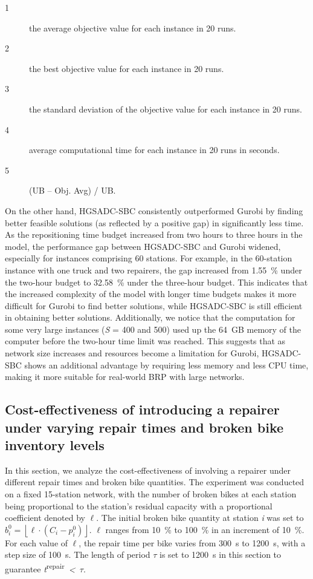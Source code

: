 \begin{landscape}
\begin{description}
\item[1]
the average objective value for each instance in 20 runs.
\item[2]
the best objective value for each instance in 20 runs.
\item[3]
the standard deviation of the objective value for each instance in 20 runs.
\item[4]
average computational time for each instance in 20 runs in seconds.
\item[5]
(UB -- Obj. Avg) / UB.
\end{description}
\end{landscape}

On the other hand, HGSADC-SBC consistently outperformed Gurobi by finding better feasible solutions
(as reflected by a positive gap) in significantly less time. As the repositioning time budget
increased from two hours to three hours in the model, the performance gap between HGSADC-SBC and
Gurobi widened, especially for instances comprising 60 stations. For example, in the 60-station
instance with one truck and two repairers, the gap increased from 1.55~\% under the two-hour budget
to 32.58~\% under the three-hour budget. This indicates that the increased complexity of the model
with longer time budgets makes it more difficult for Gurobi to find better solutions, while
HGSADC-SBC is still efficient in obtaining better solutions. Additionally, we notice that the
computation for some very large instances (\textbar{}\emph{S}\textbar{} = 400 and 500) used up the
64~GB memory of the computer before the two-hour time limit was reached. This suggests that as
network size increases and resources become a limitation for Gurobi, HGSADC-SBC shows an additional
advantage by requiring less memory and less CPU time, making it more suitable for real-world BRP
with large networks.

\subsection{Cost-effectiveness of introducing a repairer under varying repair times and broken bike inventory levels}\label{ch4:subsec:repairer-cost-effectiveness}

In this section, we analyze the cost-effectiveness of involving a repairer under different repair
times and broken bike quantities. The experiment was conducted on a fixed 15-station network, with
the number of broken bikes at each station being proportional to the station's residual capacity
with a proportional coefficient denoted by \(\ell\). The initial broken bike quantity at station
\emph{i} was set to
\(b_{i}^{0} = \left\lfloor {\ell \cdot \left( {C_{i} - p_{i}^{0}} \right)} \right\rfloor\). \(\ell\)
ranges from 10~\% to 100~\% in an increment of 10~\%. For each value of \(\ell\), the repair time
per bike varies from 300~s to 1200~s, with a step size of 100~s. The length of period \emph{\(\tau\)} is
set to 1200~s in this section to guarantee \emph{t}\textsuperscript{repair}~\emph{\textless~\(\tau\)}.

